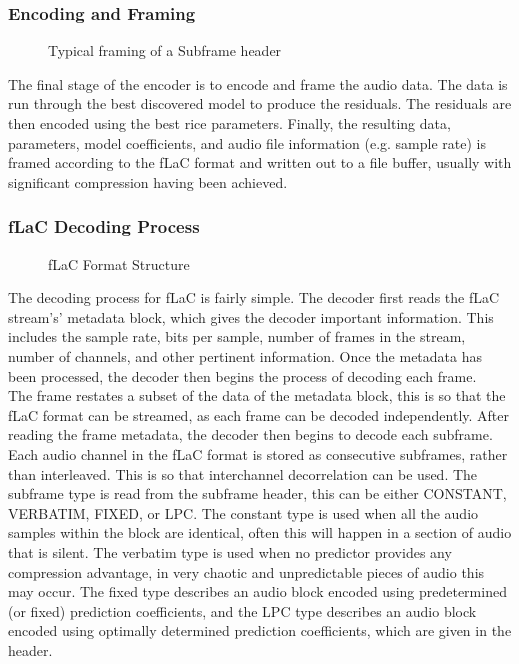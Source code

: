 \documentclass[12pt]{scrartcl}
\begin{document}
  \subsubsection*{Encoding and Framing} 
    \begin{figure}[H]
    \caption{Typical framing of a Subframe header}
    \label{fig:subframe_header}
  \end{figure}
  The final stage of the encoder is to encode and frame the audio data. The data is run through the best discovered model to produce the residuals. The residuals are then encoded using the best rice parameters. Finally, the resulting data, parameters, model coefficients, and audio file information (e.g. sample rate) is framed according to the fLaC format and written out to a file buffer, usually with significant compression having been achieved.
  
  \subsubsection{fLaC Decoding Process}
  \begin{figure}[H]
    \caption{fLaC Format Structure}
    \label{fig:flac_format_diagram}
  \end{figure}
  The decoding process for fLaC is fairly simple. The decoder first reads the fLaC stream's' metadata block, which gives the decoder important information. This includes the sample rate, bits per sample, number of frames in the stream, number of channels, and other pertinent information. Once the metadata has been processed, the decoder then begins the process of decoding each frame. \\
  
  The frame restates a subset of the data of the metadata block, this is so that the fLaC format can be streamed, as each frame can be decoded independently. After reading the frame metadata, the decoder then begins to decode each subframe. Each audio channel in the fLaC format is stored as consecutive subframes, rather than interleaved. This is so that interchannel decorrelation can be used. The subframe type is read from the subframe header, this can be either CONSTANT, VERBATIM, FIXED, or LPC. The constant type is used when all the audio samples within the block are identical, often this will happen in a section of audio that is silent. The verbatim type is used when no predictor provides any compression advantage, in very chaotic and unpredictable pieces of audio this may occur. The fixed type describes an audio block encoded using predetermined (or fixed) prediction coefficients, and the LPC type describes an audio block encoded using optimally determined prediction coefficients, which are given in the header. \\
      
\end{document}
